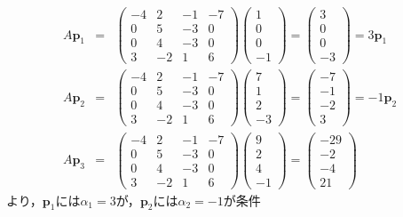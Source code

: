 \documentclass[11pt, titlepage]{jsarticle}
\begin{document}
\begin{eqnarray*}
  A \boldsymbol p_1&=&\begin{pmatrix}
    -4 & 2  & -1 & -7 \\
    0  & 5  & -3 & 0  \\
    0  & 4  & -3 & 0  \\
    3  & -2 & 1  & 6
  \end{pmatrix}\begin{pmatrix}
    1 \\
    0 \\
    0 \\
    -1
  \end{pmatrix}=\begin{pmatrix}
    3 \\
    0 \\
    0 \\
    -3
  \end{pmatrix}=3 \boldsymbol p_1\\
  A \boldsymbol p_2&=&\begin{pmatrix}
    -4 & 2  & -1 & -7 \\
    0  & 5  & -3 & 0  \\
    0  & 4  & -3 & 0  \\
    3  & -2 & 1  & 6
  \end{pmatrix}\begin{pmatrix}
    7 \\
    1 \\
    2 \\
    -3
  \end{pmatrix}=\begin{pmatrix}
    -7 \\
    -1 \\
    -2 \\
    3
  \end{pmatrix}=-1 \boldsymbol p_2\\
  A \boldsymbol p_3&=&\begin{pmatrix}
    -4 & 2  & -1 & -7 \\
    0  & 5  & -3 & 0  \\
    0  & 4  & -3 & 0  \\
    3  & -2 & 1  & 6
  \end{pmatrix}\begin{pmatrix}
    9 \\
    2 \\
    4 \\
    -1
  \end{pmatrix}=\begin{pmatrix}
    -29 \\
    -2  \\
    -4  \\
    21
  \end{pmatrix}
\end{eqnarray*}
より，$\boldsymbol p_1$には$\alpha_1=3$が，$\boldsymbol p_2$には$\alpha_2=-1$が条件
\end{document}
